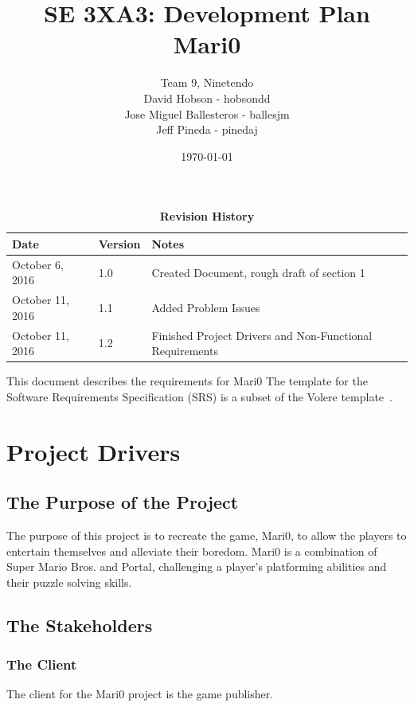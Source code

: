 \documentclass[12pt, titlepage]{article}
\title{SE 3XA3: Development Plan\\Mari0}
\author{Team 9, Ninetendo
		\\ David Hobson - hobsondd
		\\ Jose Miguel Ballesteros - ballesjm
		\\ Jeff Pineda - pinedaj
}
\date{\today}
\begin{document}
\maketitle

\tableofcontents
\listoftables
\listoffigures

\begin{table}[bp]
\caption{\bf Revision History}
\begin{tabularx}{\textwidth}{p{3cm}p{2cm}X}
\toprule {\bf Date} & {\bf Version} & {\bf Notes}\\
\midrule
October 6, 2016 & 1.0 & Created Document, rough draft of section 1\\
October 11, 2016 & 1.1 & Added Problem Issues\\
October 11, 2016 & 1.2 & Finished Project Drivers and Non-Functional Requirements\\
\bottomrule
\end{tabularx}
\end{table}

\newpage


This document describes the requirements for Mari0  The template for the Software
Requirements Specification (SRS) is a subset of the Volere
template~\citep{RobertsonAndRobertson2012}.

\section{Project Drivers}

\subsection{The Purpose of the Project}
The purpose of this project is to recreate the game, Mari0, to allow the players 
to entertain themselves and alleviate their boredom. Mari0 is a combination of
Super Mario Bros. and Portal, challenging a player's platforming abilities and their
puzzle solving skills.

\subsection{The Stakeholders}

\subsubsection{The Client}
The client for the Mari0 project is the game publisher.
\end{document}
